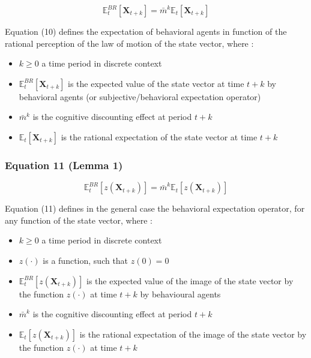 \documentclass{article}
\begin{document}
\begin{equation}
    \mathbb{E}_{t}^{BR}\left[\bm{X}_{t+k}\right]=\bar{m}^{k}\mathbb{E}_{t}\left[\bm{X}_{t+k}\right]
\end{equation}

Equation (10) defines the expectation of behavioral agents in function of the rational perception of the law of motion of the state vector, where : 
\begin{itemize}
    \item $k\geq 0$ a time period in discrete context
    \item $\mathbb{E}_{t}^{BR}\left[\bm{X}_{t+k}\right]$ is the expected value of the state vector at time $t+k$ by behavioral agents (or subjective/behavioral expectation operator)
    \item $\bar{m}^{k}$ is the cognitive discounting effect at period $t+k$
    \item $\mathbb{E}_{t}\left[\bm{X}_{t+k}\right]$ is the rational expectation of the state vector at time $t+k$
\end{itemize}

\subsubsection*{Equation 11 (Lemma 1)}

\begin{equation}
    \mathbb{E}_{t}^{BR}\left[z\left(\bm{X}_{t+k}\right)\right]=\bar{m}^{k}\mathbb{E}_{t}\left[z\left(\bm{X}_{t+k}\right)\right]
\end{equation}

Equation (11) defines in the general case the behavioral expectation operator, for any function of the state vector, where : 
\begin{itemize}
    \item $k\geq 0$ a time period in discrete context
    \item $z(\cdot)$ is a function, such that $z(0)=0$
    \item $\mathbb{E}_{t}^{BR}\left[z\left(\bm{X}_{t+k}\right)\right]$ is the expected value of the image of the state vector by the function $z(\cdot)$ at time $t+k$ by behavioural agents
    \item $\bar{m}^{k}$ is the cognitive discounting effect at period $t+k$
    \item $\mathbb{E}_{t}\left[z\left(\bm{X}_{t+k}\right)\right]$ is the rational expectation of the image of the state vector by the function $z(\cdot)$ at time $t+k$
\end{itemize}
\end{document}
